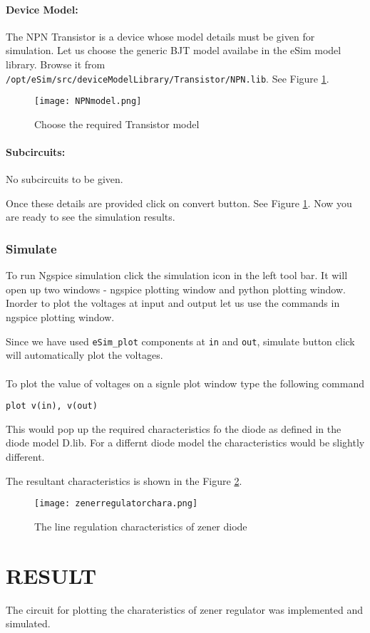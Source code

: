 \paragraph{Device Model:} The NPN Transistor is a device whose model details must be given for simulation. Let us choose the generic BJT model availabe in the eSim model library. Browse it from \texttt{/opt/eSim/src/deviceModelLibrary/Transistor/NPN.lib}. See Figure \ref{NPNmodel}.
\begin{figure}[H]
\centering
\texttt{[image: NPNmodel.png]}
\caption{Choose the required Transistor model}
\label{NPNmodel}
\end{figure}

\paragraph{Subcircuits:} No subcircuits to be given.

\noindent Once these details are provided click on convert button. See Figure \ref{NPNmodel}. Now you are ready to see the simulation results.

\subsubsection{Simulate} To run Ngspice simulation click the simulation icon in the left tool bar. It will open up two windows - ngspice plotting window and python plotting window. Inorder to plot the voltages at input and output let us use the commands in ngspice plotting window.

Since we have used \texttt{eSim\_plot} components at \texttt{in} and \texttt{out}, simulate button click will automatically plot the voltages.

\paragraph{}To plot the value of voltages on a signle plot window type the following command 

\texttt{plot v(in), v(out)}

This would pop up the required characteristics fo the diode as defined in the diode model D.lib. For a differnt diode model the characteristics would be slightly different.

The resultant characteristics is shown in the Figure \ref{zenerregulatorchara}.

\begin{figure}[H]
\centering
\texttt{[image: zenerregulatorchara.png]}
\caption{The line regulation characteristics of zener diode}
\label{zenerregulatorchara}
\end{figure}

\section*{RESULT}
The circuit for plotting the charateristics of zener regulator was implemented and simulated.


